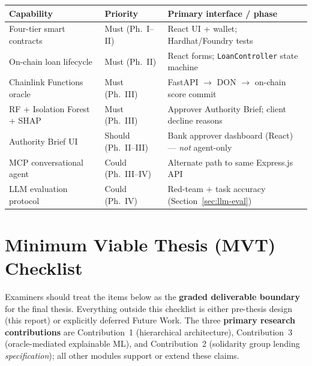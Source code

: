\documentclass[12pt,a4paper]{report}
\newcommand{\tableheadcolor}{\rowcolor{TableHeadBg}}
\begin{document}
\begin{table}[H]
\centering
\begin{tabular}{p{3.2cm}p{2.2cm}p{7.8cm}}
\toprule
\tableheadcolor
\textbf{Capability} & \textbf{Priority} & \textbf{Primary interface / phase} \\
\midrule
Four-tier smart contracts & Must (Ph.~I--II) & React UI + wallet; Hardhat/Foundry tests \\
On-chain loan lifecycle & Must (Ph.~II) & React forms; \texttt{LoanController} state machine \\
Chainlink Functions oracle & Must (Ph.~III) & FastAPI $\to$ DON $\to$ on-chain score commit \\
RF + Isolation Forest + SHAP & Must (Ph.~III) & Approver Authority Brief; client decline reasons \\
Authority Brief UI & Should (Ph.~II--III) & Bank approver dashboard (React) --- \textit{not} agent-only \\
MCP conversational agent & Could (Ph.~III--IV) & Alternate path to same Express.js API \\
LLM evaluation protocol & Could (Ph.~IV) & Red-team + task accuracy (Section~\ref{sec:llm-eval}) \\
\bottomrule
\end{tabular}
\end{table}

\section{Minimum Viable Thesis (MVT) Checklist}
\label{sec:mvt-checklist}

Examiners should treat the items below as the \textbf{graded deliverable boundary} for the final thesis. Everything outside this checklist is either pre-thesis design (this report) or explicitly deferred Future Work. The three \textbf{primary research contributions} are Contribution~1 (hierarchical architecture), Contribution~3 (oracle-mediated explainable ML), and Contribution~2 (solidarity group lending \textit{specification}); all other modules support or extend these claims.
\end{document}
